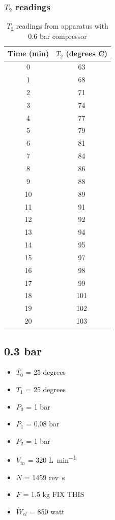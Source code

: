 \documentclass[class=article, crop=false, 12pt,a4paper]{standalone}
\numberwithin{equation}{section}
\begin{document}
\subsubsection{\(T_2\) readings}
\begin{table}
  \centering
    \begin{tabular}{|c|c|}
      \hline
      Time (\si{\minute}) & \(T_2\) (degrees C)\\
      \hline  
      0 & 63\\
      1 & 68\\
      2 & 71\\
      3 & 74\\
      4 & 77\\
      5 & 79\\
      6 & 81\\
      7 & 84\\
      8 & 86\\
      9 & 88\\
      10 & 89\\
      11 & 91\\
      12 & 92\\
      13 & 94\\
      14 & 95\\
      15 & 97\\
      16 & 98\\
      17 & 99\\
      18 & 101\\
      19 & 102\\
      20 & 103\\
      \hline
    \end{tabular}
  \caption{\(T_2\) readings from apparatus with 0.6 bar compressor}
  \label{table:2}
\end{table}
\subsection{0.3 bar}
\begin{multicols}{2}
  \begin{itemize}[noitemsep]
    \item \(T_0\) = 25 degrees
    \item \(T_1\) = 25 degrees
    \item \(P_0\) = 1 \si{\bar}
    \item \(P_1\) = 0.08 \si{\bar}
    \item \(P_2\) = 1 \si{\bar}
    \item \(V_{in}\) = 320 \si{\liter\per\minute}
    \item \(N\) = 1459 rev\si{\per\second}
    \item \(F\) = 1.5 \si{\kilogram} FIX THIS
    \item \(\dot{W}_{el}\) = 850 \si{watt}
  \end{itemize}
\end{multicols}
\end{document}
